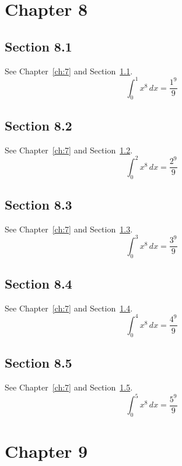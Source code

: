 \documentclass{book}
\begin{document}
\chapter{Chapter 8}\label{ch:8}
\section{Section 8.1}\label{sec:8-1}
See Chapter~\ref{ch:7} and Section~\ref{sec:8-1}.
\lipsum[42-44]
\begin{equation}\label{eq:8-1} \int_0^{1} x^{8}\,dx = \frac{1^{9}}{9}\end{equation}
\section{Section 8.2}\label{sec:8-2}
See Chapter~\ref{ch:7} and Section~\ref{sec:8-2}.
\lipsum[43-45]
\begin{equation}\label{eq:8-2} \int_0^{2} x^{8}\,dx = \frac{2^{9}}{9}\end{equation}
\section{Section 8.3}\label{sec:8-3}
See Chapter~\ref{ch:7} and Section~\ref{sec:8-3}.
\lipsum[44-46]
\begin{equation}\label{eq:8-3} \int_0^{3} x^{8}\,dx = \frac{3^{9}}{9}\end{equation}
\section{Section 8.4}\label{sec:8-4}
See Chapter~\ref{ch:7} and Section~\ref{sec:8-4}.
\lipsum[45-47]
\begin{equation}\label{eq:8-4} \int_0^{4} x^{8}\,dx = \frac{4^{9}}{9}\end{equation}
\section{Section 8.5}\label{sec:8-5}
See Chapter~\ref{ch:7} and Section~\ref{sec:8-5}.
\lipsum[46-48]
\begin{equation}\label{eq:8-5} \int_0^{5} x^{8}\,dx = \frac{5^{9}}{9}\end{equation}
\chapter{Chapter 9}\label{ch:9}
\end{document}
